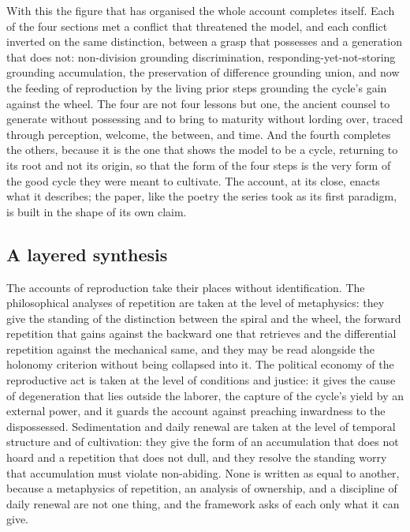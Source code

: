 With this the figure that has organised the whole account completes itself. Each of the four sections met a conflict that threatened the model, and each conflict inverted on the same distinction, between a grasp that possesses and a generation that does not: non-division grounding discrimination, responding-yet-not-storing grounding accumulation, the preservation of difference grounding union, and now the feeding of reproduction by the living prior steps grounding the cycle's gain against the wheel. The four are not four lessons but one, the ancient counsel to generate without possessing and to bring to maturity without lording over, traced through perception, welcome, the between, and time. And the fourth completes the others, because it is the one that shows the model to be a cycle, returning to its root and not its origin, so that the form of the four steps is the very form of the good cycle they were meant to cultivate. The account, at its close, enacts what it describes; the paper, like the poetry the series took as its first paradigm, is built in the shape of its own claim.

\subsection{A layered synthesis}
\label{p22:sub:reproduction-synthesis}

The accounts of reproduction take their places without identification. The philosophical analyses of repetition are taken at the level of metaphysics: they give the standing of the distinction between the spiral and the wheel, the forward repetition that gains against the backward one that retrieves and the differential repetition against the mechanical same, and they may be read alongside the holonomy criterion without being collapsed into it. The political economy of the reproductive act is taken at the level of conditions and justice: it gives the cause of degeneration that lies outside the laborer, the capture of the cycle's yield by an external power, and it guards the account against preaching inwardness to the dispossessed. Sedimentation and daily renewal are taken at the level of temporal structure and of cultivation: they give the form of an accumulation that does not hoard and a repetition that does not dull, and they resolve the standing worry that accumulation must violate non-abiding. None is written as equal to another, because a metaphysics of repetition, an analysis of ownership, and a discipline of daily renewal are not one thing, and the framework asks of each only what it can give.

